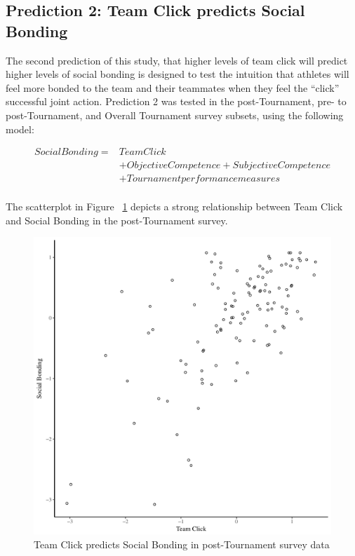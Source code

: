 \subsection{Prediction 2: Team Click predicts Social Bonding}
The second prediction of this study, that higher levels of team click will predict higher levels of social bonding is designed to test the intuition that athletes will feel more bonded to the team and their teammates when they feel the ``click'' successful joint action.  Prediction 2 was tested in the post-Tournament, pre- to post-Tournament, and Overall Tournament survey subsets, using the following model:


    \begin{align*}
      Social Bonding   =& Team Click\\
                      &+ Objective Competence + Subjective Competence  \\
                      &+ Tournament performance measures \\
    \end{align*}

  \bigskip

The scatterplot in Figure ~\ref{fig:clickBondBasicXY} depicts a strong relationship between Team Click and Social Bonding in the post-Tournament survey.

\begin{figure}[htbp]
  \centering
\includegraphics[scale=.5]{images/clickBondBasicXY.pdf}
  \caption{Team Click predicts Social Bonding in post-Tournament survey data}
  \label{fig:clickBondBasicXY}
\end{figure}

